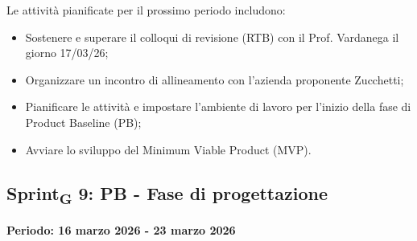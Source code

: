 \documentclass[11pt,a4paper]{article}
\newcommand{\gls}[1]{#1\textsubscript{G}}
\begin{document}
Le attività pianificate per il prossimo periodo includono:
\begin{itemize}
    \item Sostenere e superare il colloqui di revisione (RTB) con il Prof. Vardanega il giorno 17/03/26;
    \item Organizzare un incontro di allineamento con l'azienda proponente Zucchetti;
    \item Pianificare le attività e impostare l'ambiente di lavoro per l'inizio della fase di Product Baseline (PB);
    \item Avviare lo sviluppo del Minimum Viable Product (MVP).
\end{itemize}
\newpage

\subsection{\gls{Sprint} 9: PB - Fase di progettazione}
{\textbf{Periodo: 16 marzo 2026 - 23 marzo 2026}\par}
\end{document}
